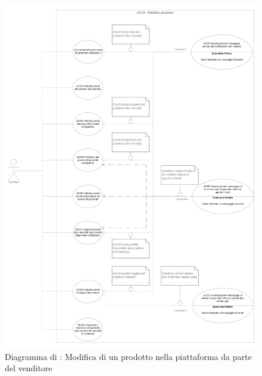 
\begin{figure}[H]
    \centering
    \includegraphics[scale=0.1]{Immagini/DiagrammiUC/UC19ModificaProdotto.png}
    \caption{Diagramma di \actualUC: Modifica di un prodotto nella piattaforma da parte del venditore}
    \label{fig:ModificaProdotto}
\end{figure}

